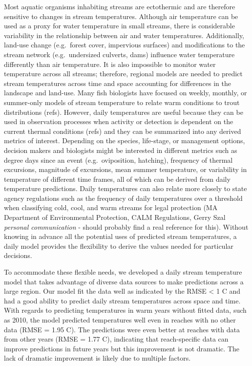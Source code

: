\documentclass[]{article}
\begin{document}
Most aquatic organisms inhabiting streams are ectothermic and are
therefore sensitive to changes in stream temperatures. Although air
temperature can be used as a proxy for water temperature in small
streams, there is considerable variability in the relationship between
air and water temperatures. Additionally, land-use change (e.g.~forest
cover, impervious surfaces) and modifications to the stream network
(e.g.~undersized culverts, dams) influence water temperature differently
than air temperature. It is also impossible to monitor water temperature
across all streams; therefore, regional models are needed to predict
stream temperatures across time and space accounting for differences in
the landscape and land-use. Many fish biologists have focused on weekly,
monthly, or summer-only models of stream temperature to relate warm
conditions to trout distributions (refs). However, daily temperatures
are useful because they can be used in observation processes when
activity or detection is dependent on the current thermal conditions
(refs) and they can be summarized into any derived metrics of interest.
Depending on the species, life-stage, or management options, decision
makers and biologists might be interested in different metrics such as
degree days since an event (e.g.~oviposition, hatching), frequency of
thermal excursions, magnitude of excursions, mean summer temperature, or
variability in temperature of different time frames, all of which can be
derived from daily temperature predictions. Daily temperatures can also
relate more closely to state agency regulations such as the frequency of
daily temperatures over a threshold when classifying cold, cool, and
warm streams for legal protection (MA Department of Environmental
Protection, CALM Regulations, Gerry Szal \emph{personal communication} -
should probably find a real reference for this). Without knowing in
advance all the potential uses of predicted stream temperatures, a daily
model provides the flexibility to derive the values needed for
particular decisions.

To accommodate these flexible needs, we developed a daily stream
temperature model that takes advantage of diverse data sources to make
predictions across a large region. Our model fit the data well as
indicated by the RMSE \textless{} 1 C and had a good ability to predict
daily stream temperatures across space and time. With regards to
predicting temperatures in warm years without fitted data, such as 2010,
the model predicted temperatures well even in reaches with no other data
(RMSE = 1.95 C). The predictions were even better at reaches with data
from other years (RMSE = 1.77 C), indicating that reach-specific data
can improve predictions in future years but this improvement is not
dramatic. The lack of dramatic improvement is likely due to multiple
factors.
\end{document}
